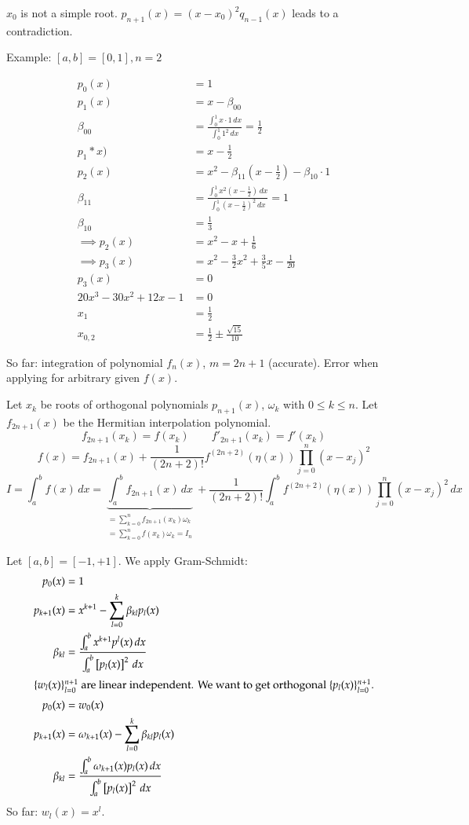 \documentclass{article}
\begin{document}
$x_0$ is not a simple root. $p_{n+1}(x) = (x - x_0)^2 q_{n-1}(x)$ leads to a contradiction.

Example: $[a,b] = [0,1], n =2$

\begin{align*}
  p_0(x) &= 1 \\
  p_1(x) &= x - \beta_{00} \\
  \beta_{00} &= \frac{\int_0^1 x \cdot 1 \, dx}{\int_0^1 1^2 \, dx} = \frac12 \\
  p_1*x) &= x - \frac12 \\
  p_2(x) &= x^2 - \beta_{11}\left(x - \frac12\right) - \beta_{10} \cdot 1 \\
  \beta_{11} &= \frac{\int_0^1 x^2 (x - \frac12) \, dx}{\int_0^1 (x - \frac12)^2 \, dx} = 1 \\
  \beta_{10} &= \frac13 \\
  \implies p_2(x) &= x^2 - x + \frac16 \\
  \implies p_3(x) &= x^2 - \frac32 x^2 + \frac35 x - \frac1{20} \\
  p_3(x) &= 0 \\
  20x^3 - 30x^2 + 12x - 1 &= 0 \\
  x_1 &= \frac12 \\
  x_{0,2} &= \frac12 \pm \frac{\sqrt{15}}{10}
\end{align*}

So far: integration of polynomial $f_n(x)$, $m=2n+1$ (accurate).
Error when applying for arbitrary given $f(x)$.

Let $x_k$ be roots of orthogonal polynomials $p_{n+1}(x)$, $\omega_k$ with $0 \leq k \leq n$.
Let $f_{2n+1}(x)$ be the Hermitian interpolation polynomial.
\[ f_{2n+1}(x_k) = f(x_k) \qquad f'_{2n+1}(x_k) = f'(x_k) \]
\[ f(x) = f_{2n+1}(x) + \frac{1}{(2n + 2)!} f^{(2n+2)}(\eta(x)) \prod_{j=0}^n (x - x_j)^2 \]
\[ I = \int_a^b f(x) \, dx = \underbrace{\int_a^b f_{2n+1}(x) \, dx}_{\substack{= \sum_{k=0}^n f_{2n+1}(x_k) \omega_k \\ = \sum_{k=0}^n f(x_k) \omega_k = I_n}} + \frac{1}{(2n + 2)!} \int_a^b f^{(2n+2)}(\eta(x)) \prod_{j=0}^n (x - x_j)^2 \, dx \]

Let $[a,b] = [-1,+1]$. We apply Gram-Schmidt:
\begin{align*}
  p_0(x) &= 1 \\
  p_{k+1}(x) &= x^{k+1} - \sum_{l=0}^k \beta_{kl} p_l(x) \\
  \beta_{kl} &= \frac{\int_a^b x^{k+1} p^l(x) \, dx}{\int_a^b \left[p_l(x)\right]^2 \, dx} \\
  \intertext{$\{w_l(x)\}_{l=0}^{n+1}$ are linear independent. We want to get orthogonal $\{p_l(x)\}_{l=0}^{n+1}$.}
  p_0(x) &= w_0(x) \\
  p_{k+1}(x) &= \omega_{k+1}(x) - \sum_{l=0}^k \beta_{kl} p_l(x) \\
  \beta_{kl} &= \frac{\int_a^b \omega_{k+1}(x) p_l(x) \, dx}{\int_a^b \left[p_l(x)\right]^2 \, dx}
\end{align*}
So far: $w_l(x) = x^l$.
\end{document}
